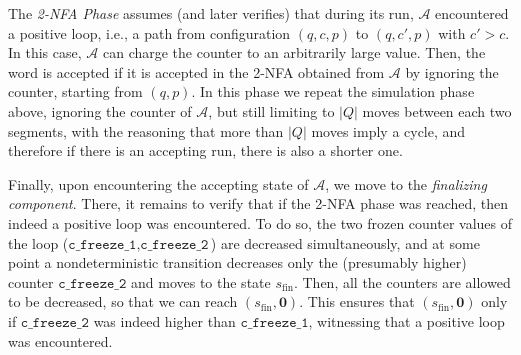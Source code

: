 \documentclass[11pt,a4paper]{amsart}
\theoremstyle{definition}
\newcommand{\tup}[1]{\langle #1 \rangle}
\newcommand{\initstate}{q_{\mathrm{init}}}
\newcommand{\accstate}{q_{\mathrm{acc}}}
\renewcommand{\vec}[1]{\boldsymbol{#1}}
\newcommand{\adds}[1]{\leftarrow #1}
\newcommand{\vf}[1]{\texttt{#1}}
\newcommand{\cA}{\mathcal{A}}
\newcommand{\cV}{\mathcal{V}}
\begin{document}
The \emph{2-NFA Phase} assumes (and later verifies) that during its
run, $\cA$ encountered a positive loop, i.e., a path from configuration
$(q,c,p)$ to $(q,c',p)$ with $c'>c$. In this case, $\cA$ can charge the counter
to an arbitrarily large value. Then, the word is accepted if it is accepted in
the 2-NFA obtained from $\cA$ by ignoring the counter, starting from
$(q,p)$. In this phase we repeat the simulation phase above, ignoring the
counter of $\cA$, but still limiting to $|Q|$ moves between each two segments,
with the reasoning that more than $|Q|$ moves imply a cycle, and therefore if
there is an accepting run, there is also a shorter one.

Finally, upon encountering the accepting state of $\cA$, we move to
the \emph{finalizing component}. There, it remains to verify that if the 2-NFA
phase was reached, then indeed a positive loop was encountered. To do so, the
two frozen counter values of the loop ($\vf{c\_freeze\_1},\vf{c\_freeze\_2}$) are decreased simultaneously, and at some
point a nondeterministic transition decreases only the (presumably
higher) counter $\vf{c\_freeze\_2}$ and moves to the state $s_{\textrm{fin}}$. Then, all the
counters are allowed to be decreased, so that we can reach
$(s_{\textrm{fin}},\vec{0})$. 
This ensures that $(s_{\textrm{fin}},\vec{0})$ only if $\vf{c\_freeze\_2}$ was indeed higher than $\vf{c\_freeze\_1}$, witnessing that a positive loop was encountered.


\end{document}
